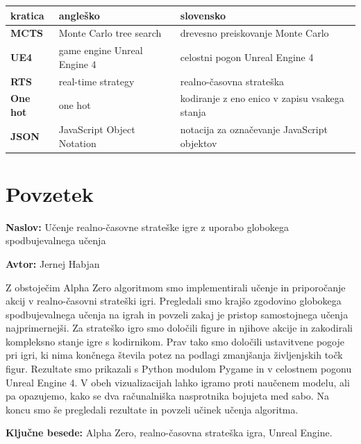 \documentclass[a4paper, 12pt]{book}
\newcommand{\ttitle}{Učenje realno-časovne strateške igre z uporabo globokega spodbujevalnega učenja}
\newcommand{\tauthor}{Jernej Habjan}
\newcommand{\tkeywords}{Alpha Zero, realno-časovna strateška igra, Unreal Engine}
\newcommand{\clearemptydoublepage}{\newpage{\pagestyle{empty}\cleardoublepage}}
\begin{document}
\noindent\begin{tabular}{p{}|p{}|p{}}    %
	{\bf kratica} & {\bf angleško} & {\bf slovensko} \\ \hline
	{\bf MCTS} & Monte Carlo tree search & drevesno preiskovanje Monte Carlo \\
	{\bf UE4} & game engine Unreal Engine 4 & celostni pogon Unreal Engine 4 \\
	{\bf RTS} & real-time strategy & realno-časovna strateška\\
	{\bf One hot} & one hot & kodiranje z eno enico v zapisu vsakega stanja  \\
	{\bf JSON} & JavaScript Object Notation & notacija za označevanje JavaScript objektov \\
\end{tabular}


\clearemptydoublepage

\chapter*{Povzetek}

\noindent\textbf{Naslov:} \ttitle
\bigskip

\noindent\textbf{Avtor:} \tauthor
\bigskip

\noindent 
Z obstoječim Alpha Zero algoritmom smo implementirali učenje in priporočanje akcij v realno-časovni strateški igri.
Pregledali smo krajšo zgodovino globokega spodbujevalnega učenja na igrah in povzeli zakaj je pristop samostojnega učenja najprimernejši.
Za strateško igro smo določili figure in njihove akcije in zakodirali kompleksno stanje igre s kodirnikom.
Prav tako smo določili ustavitvene pogoje pri igri, ki nima končnega števila potez na podlagi zmanjšanja življenjskih točk figur.
Rezultate smo prikazali s Python modulom Pygame in v celostnem pogonu Unreal Engine 4. 
V obeh vizualizacijah lahko igramo proti naučenem modelu, ali pa opazujemo, kako se dva računalniška nasprotnika bojujeta med sabo.
Na koncu smo še pregledali rezultate in povzeli učinek učenja algoritma.
\bigskip

\noindent\textbf{Ključne besede:} \tkeywords.
\clearemptydoublepage

\end{document}

